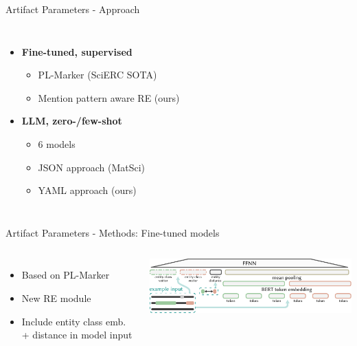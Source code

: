 \documentclass[en,16:9,smallfoot]{sdqbeamer}
\begin{document}
   \begin{frame}{Artifact Parameters - Approach}
   \begin{columns}
           \begin{itemize}
               \item \textbf{Fine-tuned, supervised}
               \begin{itemize}
                   \item PL-Marker (SciERC SOTA)
                   \item Mention pattern aware RE (ours)
               \end{itemize}
               \item \textbf{LLM, zero-/few-shot}
               \begin{itemize}
                   \item 6 models
                   \item JSON approach (MatSci)
                   \item YAML approach (ours)
               \end{itemize}
           \end{itemize}
            \ 
   \end{columns}
   \end{frame}

   \begin{frame}{Artifact Parameters - Methods: Fine-tuned models}
   \begin{columns}
           \begin{itemize}
               \item Based on PL-Marker %
               \item New RE module
               \item Include entity class emb. + distance in model input
           \end{itemize}
           \includegraphics[width=\linewidth]{imgs/ffnn_re_sub_visual_v2}
   \end{columns}
   \end{frame}
\end{document}
